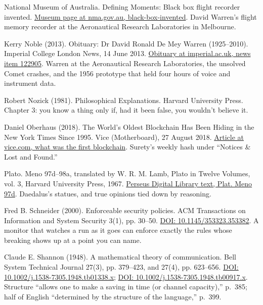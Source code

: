 \documentclass[11pt,twoside]{article}
\theoremstyle{thielethm}
\theoremstyle{thieledef}
\theoremstyle{thieledef}
\theoremstyle{thieledef}
\theoremstyle{thielethm}
\theoremstyle{thieleobs}
\theoremstyle{thielethm}
\begin{document}
\noindent National Museum of Australia. Defining Moments: Black box flight recorder invented. \href{https://www.nma.gov.au/defining-moments/resources/black-box-invented}{Museum page at nma.gov.au, black-box-invented}. David Warren's flight memory recorder at the Aeronautical Research Laboratories in Melbourne.
\par\medskip

\noindent Kerry Noble (2013). Obituary: Dr David Ronald De Mey Warren (1925--2010). Imperial College London News, 14 June 2013. \href{https://www.imperial.ac.uk/news/122905/obituary-dr-david-ronald-de-mey/}{Obituary at imperial.ac.uk, news item 122905}. Warren at the Aeronautical Research Laboratories, the unsolved Comet crashes, and the 1956 prototype that held four hours of voice and instrument data.
\par\medskip

\noindent Robert Nozick (1981). Philosophical Explanations. Harvard University Press. Chapter 3: you know a thing only if, had it been false, you wouldn't believe it.
\par\medskip

\noindent Daniel Oberhaus (2018). The World's Oldest Blockchain Has Been Hiding in the New York Times Since 1995. Vice (Motherboard), 27 August 2018. \href{https://www.vice.com/en/article/what-was-the-first-blockchain/}{Article at vice.com, what was the first blockchain}. Surety's weekly hash under ``Notices \& Lost and Found.''
\par\medskip

\noindent Plato. Meno 97d--98a, translated by W. R. M. Lamb, Plato in Twelve Volumes, vol. 3, Harvard University Press, 1967. \href{http://www.perseus.tufts.edu/hopper/text?doc=Plat.+Meno+97d}{Perseus Digital Library text, Plat. Meno 97d}. Daedalus's statues, and true opinions tied down by reasoning.
\par\medskip

\noindent Fred B. Schneider (2000). Enforceable security policies. ACM Transactions on Information and System Security 3(1), pp. 30--50. \href{https://doi.org/10.1145/353323.353382}{DOI: 10.1145/353323.353382}. A monitor that watches a run as it goes can enforce exactly the rules whose breaking shows up at a point you can name.
\par\medskip

\noindent Claude E. Shannon (1948). A mathematical theory of communication. Bell System Technical Journal 27(3), pp. 379--423, and 27(4), pp. 623--656. \href{https://doi.org/10.1002/j.1538-7305.1948.tb01338.x}{DOI: 10.1002/j.1538-7305.1948.tb01338.x}; \href{https://doi.org/10.1002/j.1538-7305.1948.tb00917.x}{DOI: 10.1002/j.1538-7305.1948.tb00917.x}. Structure ``allows one to make a saving in time (or channel capacity),'' p.~385; half of English ``determined by the structure of the language,'' p.~399.
\par\medskip
\end{document}
